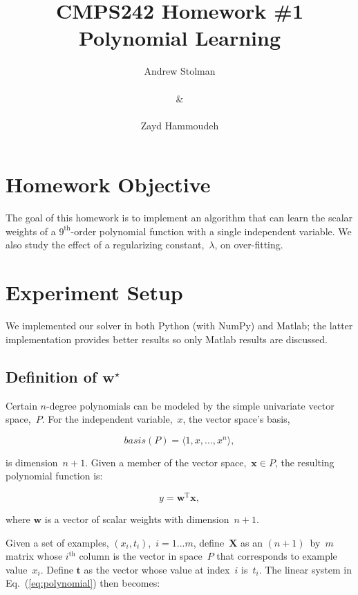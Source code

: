 \documentclass{report}
\title{\textbf{CMPS242 Homework \#1 \textendash{} Polynomial Learning}}
\author{Andrew Stolman \\~\\ \& \\~\\Zayd Hammoudeh}
\newcommand{\eref}[1]{(\ref{#1})}
\newcommand{\wstar}{\mathbf{w}^{\star}}
\begin{document}
  \maketitle
  
 
  \section{Homework Objective}
  
  The goal of this homework is to implement an algorithm that can learn the scalar weights of a {$9^{\text{th}}$-order} polynomial function with a single independent variable.  We also study the effect of a regularizing constant,~$\lambda$, on over-fitting.
  
  \section{Experiment Setup}
  
  We implemented our solver in both Python (with NumPy) and Matlab; the latter implementation provides better results so only Matlab results are discussed.  
  
  \subsection{Definition of $\wstar$}
  
  Certain $n$-degree polynomials can be modeled by the simple univariate vector space,~$P$.  For the independent variable,~$x$, the vector space's basis,
  
  \begin{equation}
    basis(P)=\langle 1,x,...,x^{n}\rangle,
  \end{equation}
  
  \noindent
  is dimension~$n+1$.  Given a member of the vector space,~${\mathbf{x} \in P}$, the resulting polynomial function is:
  
  \begin{equation}
    y=\mathbf{w}^{\text{T}}\mathbf{x},
  \end{equation}\label{eq:polynomial}
  
  \noindent
  where $\mathbf{w}$ is a vector of scalar weights with dimension~$n+1$.
  
  Given a set of examples, $(x_{i},t_{i})$,~$i=1...m$, define~$\mathbf{X}$ as an $(n+1)$~by~$m$ matrix whose $i^{\text{th}}$ column is the vector in space~$P$ that corresponds to example value~$x_{i}$.  Define  $\mathbf{t}$ as the vector whose value at index~$i$ is~$t_{i}$.  The linear system in Eq.~\eref{eq:polynomial} then becomes:
  
\end{document}
